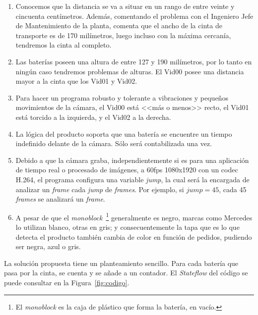 \documentclass[11pt]{memoir}
\begin{document}
\begin{enumerate}
\item Conocemos que la distancia se va a situar en un rango de entre veinte y cincuenta centímetros. Además, comentando el problema con el Ingeniero Jefe de Mantenimiento de la planta, comenta que el ancho de la cinta de transporte es de 170 milímetros, luego incluso con la máxima cercanía, tendremos la cinta al completo.
\item Las baterías poseen una altura de entre 127 y 190 milímetros, por lo tanto en ningún caso tendremos problemas de alturas. El Vid00 posee una distancia mayor a la cinta que los Vid01 y Vid02.
\item Para hacer un programa robusto y tolerante a vibraciones y pequeños movimientos de la cámara, el Vid00 está <<más o menos>> recto, el Vid01 está torcido a la izquierda, y el Vid02 a la derecha.
\item La lógica del producto soporta que una batería se encuentre un tiempo indefinido delante de la cámara. Sólo será contabilizada una vez.
\item Debido a que la cámara graba, independientemente si es para una aplicación de tiempo real o procesado de imágenes, a 60fps 1080x1920 con un codec H.264, el programa configura una variable \textit{jump}, la cual será la encargada de analizar un \textit{frame} cada \textit{jump} de \textit{frames}. Por ejemplo, si $jump = 45$, cada 45 \textit{frames} se analizará un \textit{frame}.
\item A pesar de que el \textit{monoblock}~\footnote{El \textit{monoblock} es la caja de plástico que forma la batería, en vacío.} generalmente es negro, marcas como Mercedes lo utilizan blanco, otras en gris; y consecuentemente la tapa que es lo que detecta el producto también cambia de color en función de pedidos, pudiendo ser negra, azul o gris.
\end{enumerate}

La solución propuesta tiene un planteamiento sencillo. Para cada batería que pasa por la cinta, se cuenta y se añade a un contador. 
El \textit{Stateflow} del código se puede consultar en la Figura~\ref{fig:codigo}.
\end{document}
